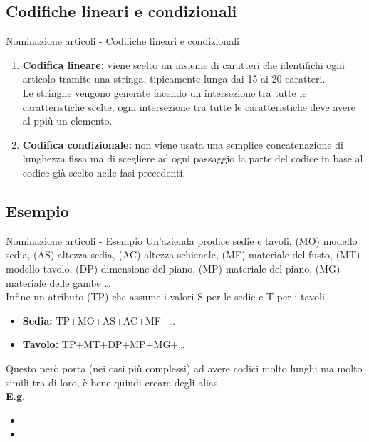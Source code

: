 \documentclass{beamer}
\begin{document}
\subsection{Codifiche lineari e condizionali}
\begin{frame}{Nominazione articoli - Codifiche lineari e condizionali}
    \begin{enumerate}
        \item \textbf{Codifica lineare:} viene scelto un insieme di caratteri che identifichi ogni articolo tramite una stringa, tipicamente lunga dai 15 ai 20 caratteri.\\
            Le stringhe vengono generate facendo un intersezione tra tutte le caratteristiche scelte, ogni intersezione tra tutte le caratteristiche deve avere al ppiù un elemento.
        \item \textbf{Codifica condizionale:} non viene usata una semplice concatenazione di lunghezza fissa ma di scegliere ad ogni passaggio la parte del codice in base al codice già scelto nelle fasi precedenti.
    \end{enumerate}
\end{frame}

\subsection{Esempio}
\begin{frame}{Nominazione articoli - Esempio}
    Un'azienda prodice sedie e tavoli, (MO) modello sedia, (AS) altezza sedia, (AC) altezza schienale, (MF) materiale del fusto, (MT) modello tavolo, (DP) dimensione del piano, (MP) materiale del piano, (MG) materiale delle gambe \dots\\
    Infine un atributo (TP) che assume i valori S per le sedie e T per i tavoli.\\
    \begin{itemize}
        \item \textbf{Sedia:} TP+MO+AS+AC+MF+\dots
        \item \textbf{Tavolo:} TP+MT+DP+MP+MG+\dots
    \end{itemize}
    Questo però porta (nei casi più complessi) ad avere codici molto lunghi ma molto simili tra di loro, è bene quindi creare degli alias.\\
    \textbf{E.g.}\\
    \begin{itemize}
        \item \color{red}{Luxury01}
        \item \color{blue}{Luxury02}
    \end{itemize}
\end{frame}
\end{document}
